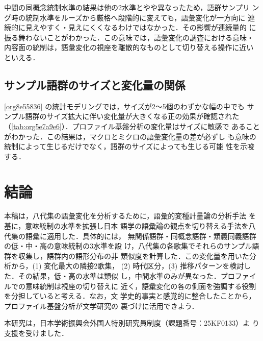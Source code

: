 \documentclass[submit]{ipsj}
\renewcommand{\ref}{\cref}
\begin{document}
中間の同概念統制水準の結果は他の2水準とやや異なったため，語群サンプリ
ング時の統制水準をルーズから厳格へ段階的に変えても，語彙変化が一方向に
連続的に見えやすく・見えにくくなるわけではなかった．その影響が連続量的
に振る舞わないことがわかった．この意味では，語彙変化の調査における意味・
内容面の統制は，語彙変化の視座を離散的なものとして切り替える操作に近い
といえる．
\subsection{サンプル語群のサイズと変化量の関係\label{orgbd5039a}}
\label{sec:org08ec320}
\ref{org8e55836} の統計モデリングでは，サイズが2〜5個のわずかな幅の中でも
サンプル語群のサイズ拡大に伴い変化量が大きくなる正の効果が確認された
（\ref{tab:org5e7a9e6}）．プロファイル基盤分析の変化量はサイズに敏感で
あることがわかった．この結果は，マクロとミクロの語彙変化量の差が必ずし
も意味の統制によって生じるだけでなく，語群のサイズによっても生じる可能
性を示唆する．
\section{結論\label{org53b13dc}}
\label{sec:orgc9bbda3}
本稿は，八代集の語彙変化を分析するために，語彙的変種計量論の分析手法
\cite{Speelman2003Profilebased} を基に，意味統制の水準を拡張し日本
語学の語彙論の観点を切り替える手法を八代集の語彙に適用した．具体的には，
無関係語群・同概念語群・類義同義語群の低・中・高の意味統制の3水準を設
け，八代集の各歌集でそれらのサンプル語群を収集し，語群内の語形分布の非
類似度を計算した．この変化量を用いた分析から，(1) 変化最大の隣接2歌集，
(2) 時代区分，(3) 推移パターンを検討した．その結果，低・高の水準は類似
し，中間水準のみが異なった．プロファイルでの意味統制は視座の切り替えに
近く，語彙変化の各の側面を強調する役割を分担していると考える．なお，文
学史的事実と感覚的に整合したことから，プロファイル基盤分析が文学研究の
裏づけに活用できよう．

\begin{acknowledgment}
  本研究は，日本学術振興会外国人特別研究員制度（課題番号：25KF0133）よ
  り支援を受けました．
\end{acknowledgment}


\end{document}
